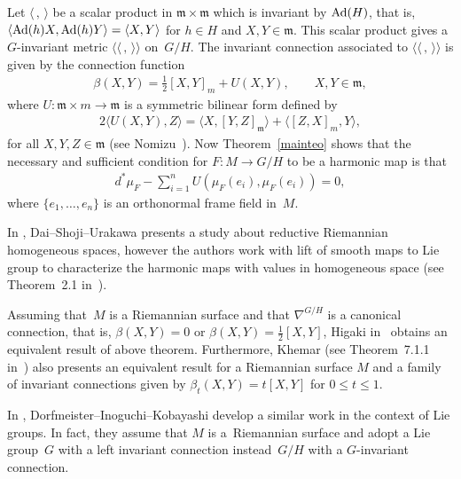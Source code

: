 \documentclass[pdftex]{sigma}
\numberwithin{equation}{section}
\newcommand{\m}{\mathfrak{m}}
\begin{document}
\begin{Example}\label{exampleriemannian}
  Let $\langle \,,\,\rangle $ be a scalar product in $\m\times \m$ which is invariant by ${\rm Ad}(H)$, that is,  $\langle {\rm Ad}(h) X, {\rm Ad}(h) Y\rangle = \langle X,Y\rangle $ for $h \in H$ and $X,Y  \in \m$.  This scalar product gives a $G$-invariant metric $\langle\langle\,,\,\rangle\rangle $ on~$G/H$. The invariant connection associated to $\langle\langle\,,\,\rangle\rangle $ is given by the connection function
  \begin{gather*}
    \beta(X,Y) = \frac{1}{2}[X,Y]_{m} + U(X,Y), \qquad X, Y \in \m,
  \end{gather*}
  where $U\colon \m\times m \rightarrow \m$ is a symmetric bilinear form def\/ined by
  \begin{gather*}
    2\langle U(X,Y),Z\rangle = \langle X, [Y,Z]_{\m}\rangle  + \langle [Z,X]_{m},Y\rangle,
  \end{gather*}
  for all $X,Y,Z \in \m$ (see Nomizu~\cite{Nomizu}). Now Theorem~\ref{mainteo} shows that the necessary and suf\/f\/icient condition for
   $F\colon  M \rightarrow G/H$ to be a harmonic map is  that
  \begin{gather*}
    d^{*}\mu_{F}  - \sum_{i=1}^{n}U(\mu_{F}(e_{i}),\mu_{F}(e_{i})) = 0,
  \end{gather*}
  where $\{ e_1, \ldots , e_n\}$ is an orthonormal frame f\/ield in~$M$.
\end{Example}

\begin{Remark}
  In \cite{DaiY/ShojiM/UrakawaH}, Dai--Shoji--Urakawa presents a study about reductive Riemannian homogeneous spaces, however the authors work with lift of smooth maps to Lie group to characterize the harmonic maps with values in homogeneous space (see Theorem~2.1 in~\cite{DaiY/ShojiM/UrakawaH}).

  Assuming that~$M$ is a Riemannian surface and that $\nabla^{G/H}$ is a   canonical  connection, that is,
  $\beta(X,Y) = 0$ or $\beta(X,Y) = \frac{1}{2}[X,Y]$, Higaki in~\cite{Higaki} obtains an equivalent result of above theorem.
  Furthermore, Khemar (see Theorem~7.1.1 in~\cite{Khemar})
  also presents an equivalent result for a Riemannian surface $M$ and a family of invariant connections  given by
  $\beta_t(X,Y) = t[X,Y]$ for $0 \leq t \leq 1$.

  In \cite{DorfmeisterJ/InoguchiJ/KobayashiS}, Dorfmeister--Inoguchi--Kobayashi develop a similar work in the context
  of Lie groups. In fact, they assume that $M$ is a~Riemannian surface  and adopt a Lie group~$G$ with a left invariant
  connection instead~$G/H$ with a $G$-invariant connection.
\end{Remark}
\end{document}
